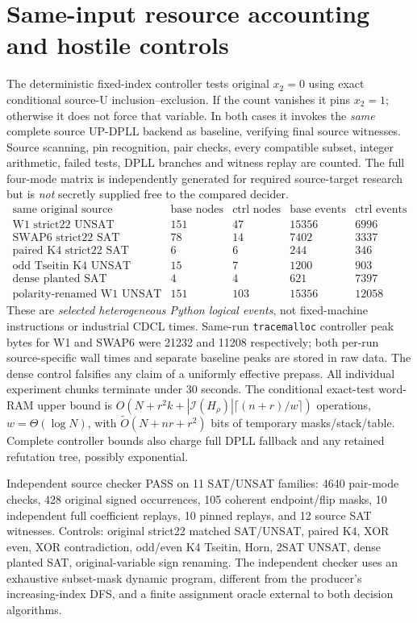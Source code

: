 \documentclass[10pt]{article}
\begin{document}
\section{Same-input resource accounting and hostile controls}
The deterministic fixed-index controller tests original $x_2=0$ using exact conditional source-U inclusion--exclusion. If the count vanishes it pins $x_2=1$; otherwise it does not force that variable. In both cases it invokes the \emph{same} complete source UP-DPLL backend as baseline, verifying final source witnesses. Source scanning, pin recognition, pair checks, every compatible subset, integer arithmetic, failed tests, DPLL branches and witness replay are counted. The full four-mode matrix is independently generated for required source-target research but is \emph{not} secretly supplied free to the compared decider.
\[
\begin{array}{lrrrr}
\text{same original source}&\text{base nodes}&\text{ctrl nodes}&\text{base events}&\text{ctrl events}\\
\text{W1 strict22 UNSAT}&151&47&15356&6996\\
\text{SWAP6 strict22 SAT}&78&14&7402&3337\\
\text{paired K4 strict22 SAT}&6&6&244&346\\
\text{odd Tseitin K4 UNSAT}&15&7&1200&903\\
\text{dense planted SAT}&4&4&621&7397\\
\text{polarity-renamed W1 UNSAT}&151&103&15356&12058
\end{array}
\]
These are \emph{selected heterogeneous Python logical events}, not fixed-machine instructions or industrial CDCL times. Same-run \texttt{tracemalloc} controller peak bytes for W1 and SWAP6 were 21232 and 11208 respectively; both per-run source-specific wall times and separate baseline peaks are stored in raw data. The dense control falsifies any claim of a uniformly effective prepass. All individual experiment chunks terminate under 30 seconds. The conditional exact-test word-RAM upper bound is $O(N+r^2k+|\mathcal I(H_\rho)|\lceil(n+r)/w\rceil)$ operations, $w=\Theta(\log N)$, with $\tilde O(N+nr+r^2)$ bits of temporary masks/stack/table. Complete controller bounds also charge full DPLL fallback and any retained refutation tree, possibly exponential.

Independent source checker PASS on 11 SAT/UNSAT families: 4640 pair-mode checks, 428 original signed occurrences, 105 coherent endpoint/flip masks, 10 independent full coefficient replays, 10 pinned replays, and 12 source SAT witnesses. Controls: original strict22 matched SAT/UNSAT, paired K4, XOR even, XOR contradiction, odd/even K4 Tseitin, Horn, 2SAT UNSAT, dense planted SAT, original-variable sign renaming. The independent checker uses an exhaustive subset-mask dynamic program, different from the producer's increasing-index DFS, and a finite assignment oracle external to both decision algorithms.
\end{document}
